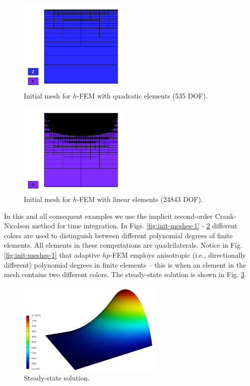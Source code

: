 \documentclass[final,3p,times,twocolumn]{elsarticle}
\begin{document}
\begin{figure}[!ht]
\begin{center}
\includegraphics[height=4.5cm]{mesh_init_h2.png}
\end{center}
\vspace{-6mm}
\caption{Initial mesh for $h$-FEM with quadratic elements (535 DOF).}
\label{fig:init-meshes-2}
\end{figure}

\begin{figure}[!ht]
\begin{center}
\includegraphics[height=4.5cm]{mesh_init_h1.png}
\end{center}
\vspace{-6mm}
\caption{Initial mesh for $h$-FEM with linear elements (24843 DOF).}
\label{fig:init-meshes-3}
\end{figure}
In this and all consequent examples we use the implicit second-order 
Crank-Nicolson method for time integration.
In Figs. \ref{fig:init-meshes-1} - \ref{fig:init-meshes-3} 
different colors are used to distinguish between 
different polynomial degrees of finite elements. All elements in these computations 
are quadrilaterals. Notice in Fig. \ref{fig:init-meshes-1} that adaptive $hp$-FEM employs
anisotropic (i.e., directionally different) polynomial degrees in finite 
elements -- this is when an element in the mesh contains two different colors. 
The steady-state solution is shown in Fig. \ref{fig:steady-state}. 

\begin{figure}[!ht]
\begin{center}
\includegraphics[height=4.5cm]{solution_final.png}
\end{center}
\vspace{-6mm}
\caption{Steady-state solution.}
\label{fig:steady-state}
\end{figure}
\end{document}
